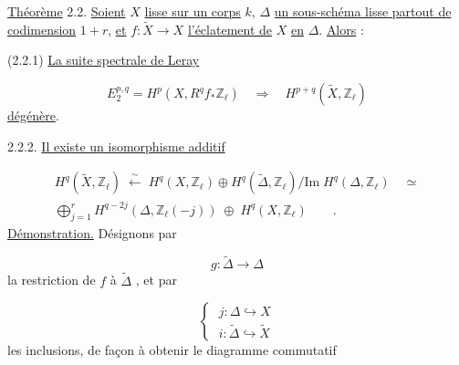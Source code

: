 \underline{Théorème} 2.2.  \underline{Soient} $X$ \underline{lisse sur un corps} $k$, $\Delta$ \underline{un sous-schéma lisse partout de codimension} $1 + r$, \underline{et} $f : \widetilde{X} \longrightarrow X$ \underline{l'éclatement de} $X$ \underline{en} $\Delta$. \underline{Alors} :

(2.2.1) \underline{La suite spectrale de Leray}

\begin{equation*}
E_2^{p,q} = H^p(X, R^q f_* \mathbb{Z}_\ell) \quad \Longrightarrow \quad H^{p+q}(\widetilde{X},\mathbb{Z}_\ell)
\end{equation*}
\underline{dégénère}.



2.2.2.  \underline{Il existe un isomorphisme additif}

\begin{equation*}
\begin{gathered}
H^q(\widetilde{X}, \mathbb{Z}_\ell) \;\overset{\sim}{\longleftarrow}\; H^q(X, \mathbb{Z}_\ell) \oplus H^q(\widetilde{\Delta}, \mathbb{Z}_\ell)/\mathrm{Im}\; H^q(\Delta, \mathbb{Z}_\ell) \quad \simeq \\
\bigoplus_{j=1}^{r} H^{q-2j}(\Delta, \mathbb{Z}_\ell(-j)) \;\oplus\; H^q(X, \mathbb{Z}_\ell) \qquad .
\end{gathered}
\end{equation*}
\underline{Démonstration.}  Désignons par

\begin{equation}\tag{2.2.3}
g : \widetilde{\Delta} \longrightarrow \Delta
\end{equation}
la restriction de $f$ à $\widetilde{\Delta}$ , et par

\begin{equation}\tag{2.2.4}
\left\{\;
\begin{array}{l}
j : \Delta \hookrightarrow X \\[6ex]
i : \widetilde{\Delta} \hookrightarrow \widetilde{X}
\end{array}
\right.
\end{equation}
les inclusions, de façon à obtenir le diagramme commutatif

